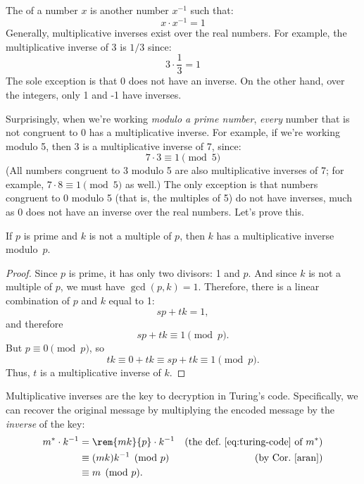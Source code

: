 \subsection{}
\label{sec:prime}

The  of a number $x$ is another number $x^{-1}$ such that: %
\[
x \cdot x^{-1} = 1
\]
Generally, multiplicative inverses exist over the real numbers.  For example, the
multiplicative inverse of 3 is $1 / 3$ since:
\[
3 \cdot \frac{1}{3} = 1
\]
The sole exception is that 0 does not have an inverse.  On the other hand, over the
integers, only 1 and -1 have inverses.

Surprisingly, when we're working \emph{modulo a prime number}, \emph{every} number that is
not congruent to 0 has a multiplicative inverse.  For example, if we're working modulo 5,
then 3 is a multiplicative inverse of 7, since:
\[
7 \cdot 3 \equiv 1 \pmod{5}
\]
(All numbers congruent to 3 modulo 5 are also multiplicative inverses of 7; for example,
$7 \cdot 8 \equiv 1 \pmod{5}$ as well.)  The only exception is that numbers congruent to 0
modulo 5 (that is, the multiples of 5) do not have inverses, much as 0 does not have an
inverse over the real numbers.  Let's prove this.

\begin{lemma}
\label{lem:inverses}
If $p$ is prime and $k$ is not a multiple of $p$, then $k$ has a multiplicative inverse
modulo~$p$.
\end{lemma}

\begin{proof}
Since $p$ is prime, it has only two divisors: 1 and $p$.  And since $k$ is not a multiple
of $p$, we must have $\gcd(p, k) = 1$.  Therefore, there is a linear combination of $p$ and
$k$ equal to 1:
\[
s p + t k = 1,
\]
and therefore
\[
s p + t k \equiv 1 \pmod{p}.
\]
But $p \equiv 0 \pmod{p}$, so
\[
tk \equiv 0 + tk \equiv sp +tk \equiv 1 \pmod{p}.
\]
Thus, $t$ is a multiplicative inverse of $k$.
\end{proof}

Multiplicative inverses are the key to decryption in Turing's code.  Specifically, we can
recover the original message by multiplying the encoded message by the \emph{inverse} of
the key:
\begin{align*}
m^* \cdot k^{-1} & = \rem{mk}{p} \cdot k^{-1} & \text{(the def.~\eqref{eq:turing-code} of
  $m^*$)}\\ & \equiv (mk)k^{-1} \pmod{p} & \text{(by Cor.~\ref{aran})}\\ & \equiv m
\pmod{p}.
\end{align*}

